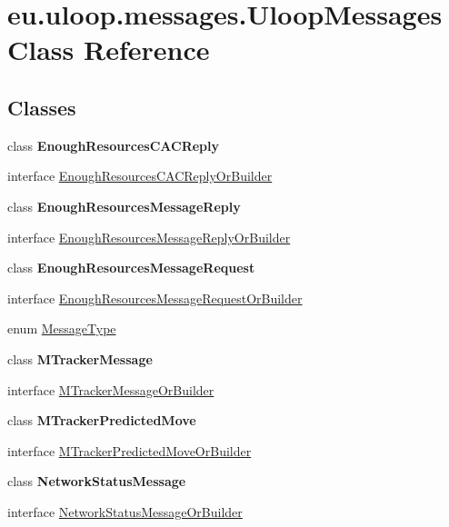 \hypertarget{classeu_1_1uloop_1_1messages_1_1UloopMessages}{\section{eu.\+uloop.\+messages.\+Uloop\+Messages Class Reference}
\label{classeu_1_1uloop_1_1messages_1_1UloopMessages}
}
\subsection*{Classes}
\begin{DoxyCompactItemize}
\item 
class {\bfseries Enough\+Resources\+C\+A\+C\+Reply}
\item 
interface \hyperlink{interfaceeu_1_1uloop_1_1messages_1_1UloopMessages_1_1EnoughResourcesCACReplyOrBuilder}{Enough\+Resources\+C\+A\+C\+Reply\+Or\+Builder}
\item 
class {\bfseries Enough\+Resources\+Message\+Reply}
\item 
interface \hyperlink{interfaceeu_1_1uloop_1_1messages_1_1UloopMessages_1_1EnoughResourcesMessageReplyOrBuilder}{Enough\+Resources\+Message\+Reply\+Or\+Builder}
\item 
class {\bfseries Enough\+Resources\+Message\+Request}
\item 
interface \hyperlink{interfaceeu_1_1uloop_1_1messages_1_1UloopMessages_1_1EnoughResourcesMessageRequestOrBuilder}{Enough\+Resources\+Message\+Request\+Or\+Builder}
\item 
enum \hyperlink{enumeu_1_1uloop_1_1messages_1_1UloopMessages_1_1MessageType}{Message\+Type}
\item 
class {\bfseries M\+Tracker\+Message}
\item 
interface \hyperlink{interfaceeu_1_1uloop_1_1messages_1_1UloopMessages_1_1MTrackerMessageOrBuilder}{M\+Tracker\+Message\+Or\+Builder}
\item 
class {\bfseries M\+Tracker\+Predicted\+Move}
\item 
interface \hyperlink{interfaceeu_1_1uloop_1_1messages_1_1UloopMessages_1_1MTrackerPredictedMoveOrBuilder}{M\+Tracker\+Predicted\+Move\+Or\+Builder}
\item 
class {\bfseries Network\+Status\+Message}
\item 
interface \hyperlink{interfaceeu_1_1uloop_1_1messages_1_1UloopMessages_1_1NetworkStatusMessageOrBuilder}{Network\+Status\+Message\+Or\+Builder}
\item 

\end{DoxyCompactItemize}
